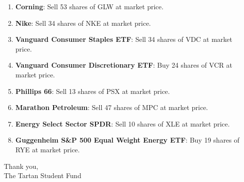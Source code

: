 \documentclass[11pt,pressrelease]{newlfm} %
\begin{document}
\begin{newlfm}




\begin{enumerate}
\item \textbf{Corning}: Sell 53 shares of GLW at market price.

\item  \textbf{Nike}: Sell 34 shares of NKE at market price.

\item  \textbf{Vanguard Consumer Staples ETF}: Sell 34 shares of VDC at market price.

\item  \textbf{Vanguard Consumer Discretionary ETF}: Buy 24 shares of VCR at market price.

\item  \textbf{Phillips 66}: Sell 13 shares of PSX at market price.

\item  \textbf{Marathon Petroleum}: Sell 47 shares of MPC at market price.

\item  \textbf{Energy Select Sector SPDR}: Sell 10 shares of XLE at market price.

\item  \textbf{Guggenheim S\&P 500 Equal Weight Energy ETF}: Buy 19 shares of RYE at market price.



\end{enumerate}


Thank you, \\
The Tartan Student Fund



\end{newlfm}
\end{document}
